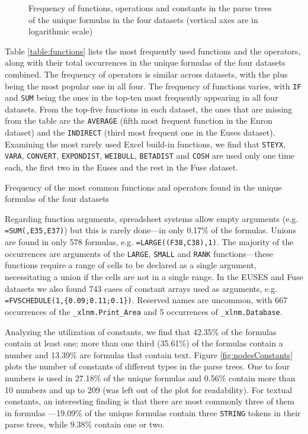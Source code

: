 \documentclass[times]{smrauth}
\begin{document}
\begin{figure}
	\caption{Frequency of functions, operations and constants in the parse trees of the unique formulas in the four datasets (vertical axes are in logarithmic scale)}
\end{figure}

Table \ref{table:functions} lists the most frequently used functions and the operators, along with their total occurrences in the unique formulas of the four datasets combined. The frequency of operators is similar across datasets, with the plus being the most popular one in all four. The frequency of functions varies, with \texttt{IF} and \texttt{SUM} being the ones in the top-ten most frequently appearing in all four datasets. From the top-five functions in each dataset, the ones that are missing from the table are the \texttt{AVERAGE} (fifth most frequent function in the Enron dataset) and the \texttt{INDIRECT} (third most frequent one in the Euses dataset). Examining the most rarely used Excel build-in functions, we find that \texttt{STEYX}, \texttt{VARA}, \texttt{CONVERT}, \texttt{EXPONDIST}, \texttt{WEIBULL}, \texttt{BETADIST} and \texttt{COSH} are used only one time each, the first two in the Euses and the rest in the Fuse dataset.

\begin{table}[]
	\centering
	\caption{Frequency of the most common functions and operators found in the unique formulas of the four datasets}
	\label{table:functions}
	
\end{table}

Regarding function arguments, spreadsheet systems allow empty arguments (e.g. \texttt{=SUM(,E35,E37)}) but this is rarely done---in only 0.17\% of the formulas. Unions are found in only 578 formulas, e.g. \texttt{=LARGE((F38,C38),1)}. The majority of the occurrences are arguments of the \texttt{LARGE},  \texttt{SMALL} and \texttt{RANK} functions---these functions require a range of cells to be declared as a single argument, necessitating a union if the cells are not in a single range. In the EUSES and Fuse datasets we also found 743 cases of constant arrays used as arguments, e.g. \texttt{=FVSCHEDULE(1,\{0.09;0.11;0.1\})}. Reserved names are uncommon, with 667 occurrences of the \texttt{_xlnm.Print_Area} and 5 occurrences of \texttt{_xlnm.Database}.

Analyzing the utilization of constants, we find that 42.35\% of the formulas contain at least one; more than one third (35.61\%) of the formulas contain a number and 13.39\% are formulas that contain text. Figure \ref{fig:nodesConstants} plots the number of constants of different types in the parse trees. One to four numbers is used in 27.18\% of the unique formulas and 0.56\% contain more than 10 numbers and up to 209 (was left out of the plot for readability). For textual constants, an interesting finding is that there are most commonly three of them in formulas ---19.09\% of the unique formulas contain three \texttt{STRING} tokens in their parse trees, while 9.38\% contain one or two.
\end{document}
